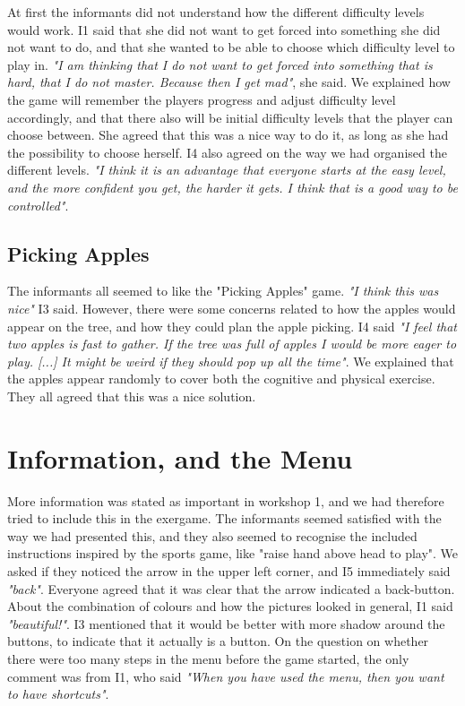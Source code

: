 At first the informants did not understand how the different difficulty levels would work. I1 said that she did not want to get forced into something she did not want to do, and that she wanted to be able to choose which difficulty level to play in. \emph{"I am thinking that I do not want to get forced into something that is hard, that I do not master. Because then I get mad"}, she said. We explained how the game will remember the players progress and adjust difficulty level accordingly, and that there also will be initial difficulty levels that the player can choose between. She agreed that this was a nice way to do it, as long as she had the possibility to choose herself. I4 also agreed on the way we had organised the different levels. \emph{"I think it is an advantage that everyone starts at the easy level, and the more confident you get, the harder it gets. I think that is a good way to be controlled"}.

\subsection{Picking Apples}

The informants all seemed to like the "Picking Apples" game. \emph{"I think this was nice"} I3 said. However, there were some concerns related to how the apples would appear on the tree, and how they could plan the apple picking. I4 said \emph{"I feel that two apples is fast to gather. If the tree was full of apples I would be more eager to play. [...] It might be weird if they should pop up all the time"}. We explained that the apples appear randomly to cover both the cognitive and physical exercise. They all agreed that this was a nice solution. 


\section{Information, and the Menu}

More information was stated as important in workshop 1, and we had therefore tried to include this in the exergame. The informants seemed satisfied with the way we had presented this, and they also seemed to recognise the included instructions inspired by the sports game, like "raise hand above head to play". We asked if they noticed the arrow in the upper left corner, and I5 immediately said \emph{"back"}. Everyone agreed that it was clear that the arrow indicated a back-button. About the combination of colours and how the pictures looked in general, I1 said \emph{"beautiful!"}. I3 mentioned that it would be better with more shadow around the buttons, to indicate that it actually is a button. On the question on whether there were too many steps in the menu before the game started, the only comment was from I1, who said \emph{"When you have used the menu, then you want to have shortcuts"}. 

